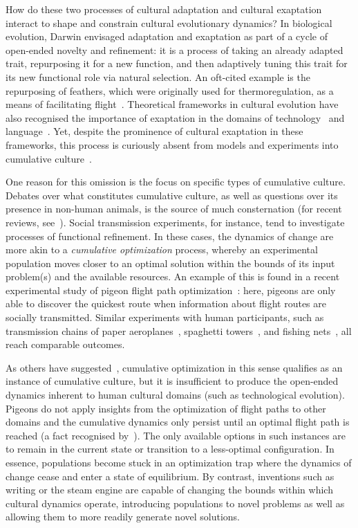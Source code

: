 \documentclass{article}
\begin{document}
How do these two processes of cultural adaptation and cultural exaptation interact to shape and constrain cultural evolutionary dynamics? In biological evolution, Darwin envisaged adaptation and exaptation as part of a cycle of open-ended novelty and refinement: it is a process of taking an already adapted trait, repurposing it for a new function, and then adaptively tuning this trait for its new functional role via natural selection. An oft-cited example is the repurposing of feathers, which were originally used for thermoregulation, as a means of facilitating flight~\cite{gould1982exaptation}. Theoretical frameworks in cultural evolution have also recognised the importance of exaptation in the domains of technology~\cite{boyd2013cultural} and language~\cite{lass1990things}. Yet, despite the prominence of cultural exaptation in these frameworks, this process is curiously absent from models and experiments into cumulative culture~\cite{mesoudi_alex_what_2018}.

One reason for this omission is the focus on specific types of cumulative culture. Debates over what constitutes cumulative culture, as well as questions over its presence in non-human animals, is the source of much consternation (for recent reviews, see~\cite{miton2018cumulative,mesoudi_alex_what_2018}). Social transmission experiments, for instance, tend to investigate processes of functional refinement. In these cases, the dynamics of change are more akin to a {\em cumulative optimization} process, whereby an experimental population moves closer to an optimal solution within the bounds of its input problem(s) and the available resources. An example of this is found in a recent experimental study of pigeon flight path optimization~\cite{sasaki_cumulative_2017}: here, pigeons are only able to discover the quickest route when information about flight routes are socially transmitted. Similar experiments with human participants, such as transmission chains of paper aeroplanes~\cite{xxxx}, spaghetti towers~\cite{xxxx}, and fishing nets~\cite{caldwell2016experimental}, all reach comparable outcomes.

As others have suggested~\cite{mesoudi_alex_what_2018}, cumulative optimization in this sense qualifies as an instance of cumulative culture, but it is insufficient to produce the open-ended dynamics inherent to human cultural domains (such as technological evolution). Pigeons do not apply insights from the optimization of flight paths to other domains and the cumulative dynamics only persist until an optimal flight path is reached (a fact recognised by~\cite{sasaki_cumulative_2017}). The only available options in such instances are to remain in the current state or transition to a less-optimal configuration. In essence, populations become stuck in an optimization trap where the dynamics of change cease and enter a state of equilibrium. By contrast, inventions such as writing or the steam engine are capable of changing the bounds within which cultural dynamics operate, introducing populations to novel problems as well as allowing them to more readily generate novel solutions.
\end{document}
